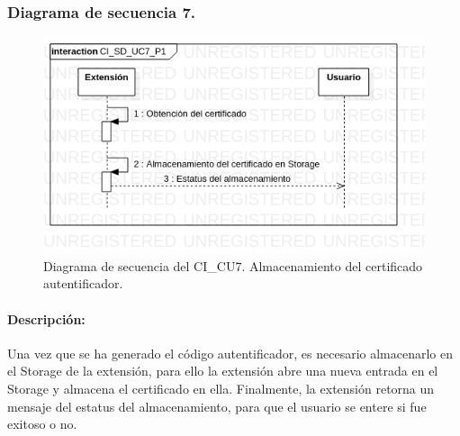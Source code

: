 \documentclass[12pt, a4paper, titlepage]{report}
\begin{document}
    			
    			\subsubsection{Diagrama de secuencia 7.}
        			\begin{figure}[H]
        				\begin{center}    		    	\includegraphics[width=15cm]{./imagenes/Disenio/Componente_1/CI_SD_UC7_P1.png}
        				\caption[Diagrama de secuencia 7 del Componente I]{Diagrama de secuencia del CI\_CU7. Almacenamiento del certificado autentificador.}
        				\end{center}
        			\end{figure}
        			
        			\paragraph{Descripción:}
        			Una vez que se ha generado el código autentificador, es necesario almacenarlo en el Storage de la extensión, para ello la extensión abre una nueva entrada en el Storage y almacena el certificado en ella. Finalmente, la extensión retorna un mensaje del estatus del almacenamiento, para que el usuario se entere si fue exitoso o no.
    			
    			
\end{document}
